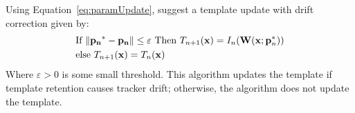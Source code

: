   Using Equation~\ref{eq:paramUpdate}, \citeauthor{templateUpdate} suggest a template update with drift correction given by:
  \begin{align*}
    &\text{If } \norm{\mathbf{p_n}^* - \mathbf{p_n}} \leq \varepsilon \text{ Then } T_{n+1} (\mathbf{x}) = I_n(\mathbf{W}(\mathbf{x};\mathbf{p}_n^*))\\
    &\text{else } T_{n+1}(\mathbf{x}) = T_n(\mathbf{x})
  \end{align*}
  Where $\varepsilon > 0$ is some small threshold.
  This algorithm updates the template if template retention causes tracker drift; otherwise, the algorithm does not update the template.
